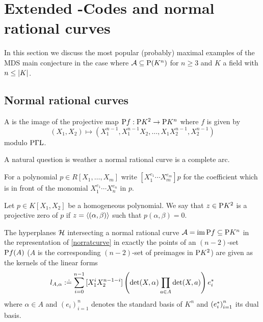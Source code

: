 \section{Extended -Codes and normal rational curves}\label{sec-reedsolomon}

In this section we discuss the most popular (probably) maximal examples of the MDS main conjecture in the case where $\cA\setleq \P(K^n)$ for $n\geq 3$ and $K$ a field with $n\leq\left|K\right|$.

\subsection{Normal rational curves}

\begin{definition}\label{norratcurve}
    A  is the image of the projective map $\mathrm{P}{f}:\mathrm{P}{K^2}\rightarrow\mathrm{P}{K^n}$ where $f$ is given by
    $$
    (X_1,X_2) \mapsto (X_1^{n-1},X_1^{n-1}X_2,\ldots,X_1X_2^{n-1},X_2^{n-1})
    $$
    modulo $\mathrm{P\Gamma L}$.
\end{definition}

A natural question is weather a normal rational curve is a complete arc.

\begin{definition}
    For a polynomial $p\in R[X_1,\ldots,X_m]$ write $[X_1^{e_1}\cdots X_m^{e_m}]p$ for the coefficient which is in front of the monomial $X_1^{e_1}\cdots X_n^{e_n}$ in $p$.
\end{definition}

\begin{definition}
    Let $p\in K[X_1,X_2]$ be a homogeneous polynomial. We say that $z\in\mathrm{P}{K^2}$ is a projective zero of $p$ if $z=\gen{(\alpha,\beta)}$ such that $p(\alpha,\beta)=0$. 
\end{definition}

\begin{lemma}\label{norrattandesc}
    The hyperplanes $\mathcal{H}$ intersecting a normal rational curve $\mathcal{A}=\mathop\mathrm{im}\mathrm{P}{f}\subseteq \mathrm{P}{K^n}$ in the representation of \autoref{norratcurve} in exactly the points of an $(n-2)$-set $\mathrm{P}{f}(A)$ ($A$ is the corresponding $(n-2)$-set of preimages in $\mathrm{P} K^2$) are given as the kernels of the linear forms 
    $$
    l_{A,\alpha}:\doteq\sum_{i=0}^{n-1}{[X_1^i X_2^{n-1-i}]\left(\det(X,\alpha)\prod_{a\in A}{\det(X,a)}\right)e^{\ast}_i}
    $$
    where $\alpha\in A$ and ${(e_i)}_{i=1}^n$ denotes the standard basis of $K^n$ and ${(e^{\ast}_i)}_{i=1}^n$ its dual basis.  
\end{lemma}

